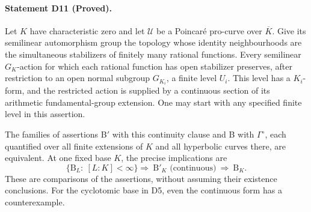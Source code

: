 \paragraph{Statement D11 (Proved).}\label{res:D11}
Let $K$ have characteristic zero and let $\mathcal U$ be a Poincar\'e
pro-curve over $\overline K$.  Give its semilinear automorphism group
the topology whose identity neighbourhoods are the simultaneous
stabilizers of finitely many rational functions.  Every semilinear
$G_K$-action for which each rational function has open stabilizer
preserves, after restriction to an open normal subgroup $G_{K_i}$, a
finite level $U_i$.  This level has a $K_i$-form, and the restricted
action is supplied by a continuous section of its arithmetic
fundamental-group extension.  One may start with any specified finite
level in this assertion.

The families of assertions B$'$ with this continuity clause and B with
$\Gamma^\circ$, each quantified over all finite extensions of $K$ and
all hyperbolic curves there, are equivalent.  At one fixed base $K$,
the precise implications are
\[
 \{\mathrm B_L:\ [L:K]<\infty\} \Longrightarrow\
 \mathrm B'_K\text{ (continuous)}\ \Longrightarrow\ \mathrm B_K.
\]
These are comparisons of the assertions, without assuming their
existence conclusions.  For the cyclotomic base in D5, even the
continuous form has a counterexample.


